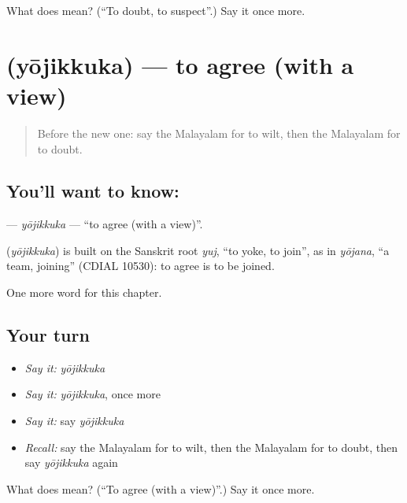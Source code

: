 \begin{tcolorbox}[breakable,colback=teal!4,colframe=teal!35!black,title={Before you move on}]
What does  mean? (\textquotedblleft{}To doubt, to suspect\textquotedblright{}.) Say it once more.
\end{tcolorbox}
\section[\texorpdfstring{\ml{യോജിക്കുക} (yōjikkuka)}{യോജിക്കുക (yōjikkuka)}]{ (yōjikkuka) — to agree (with a view)}

\label{lesson:ML-C229-yojikkuka}



\begin{quote}
Before the new one: say the Malayalam for to wilt, then the Malayalam for to doubt.
\end{quote}

\subsection*{You'll want to know: }
\textbf{} — \emph{yōjikkuka} — \textquotedblleft{}to agree (with a view)\textquotedblright{}.

\begin{cousinweb}
\textbf{} (\emph{yōjikkuka}) is built on the Sanskrit root \emph{yuj}, \textquotedblleft{}to yoke, to join\textquotedblright{}, as in \emph{yōjana}, \textquotedblleft{}a team, joining\textquotedblright{} (CDIAL 10530): to agree is to be joined.
\end{cousinweb}

\begin{grammarlens}[title={What you've built}]
One more word for this chapter.
\end{grammarlens}

\subsection*{Your turn}
\begin{itemize}
\raggedright
  \item \emph{Say it:} \emph{yōjikkuka}
  \item \emph{Say it:} \emph{yōjikkuka}, once more
  \item \emph{Say it:} say \emph{yōjikkuka}
  \item \emph{Recall:} say the Malayalam for to wilt, then the Malayalam for to doubt, then say \emph{yōjikkuka} again
\end{itemize}

\begin{tcolorbox}[breakable,colback=teal!4,colframe=teal!35!black,title={Before you move on}]
What does  mean? (\textquotedblleft{}To agree (with a view)\textquotedblright{}.) Say it once more.
\end{tcolorbox}
